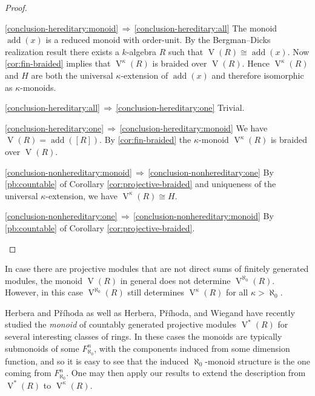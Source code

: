 \documentclass[a4paper,11pt,oneside]{amsart}
\theoremstyle{remark}
\DeclareMathOperator{\add}{add}
\DeclareMathOperator{\Vmon}{V}
\begin{document}
\begin{proof}
  \begin{proofenumerate}
  \item[\ref{hereditary}]
  \ref{conclusion-hereditary:monoid}$\,\Rightarrow\,$\ref{conclusion-hereditary:all}
  The monoid $\add(x)$ is a reduced monoid with order-unit.
  By the Bergman--Dicks realization result there exists a $k$-algebra $R$ such that $\Vmon(R) \cong \add(x)$.
  Now \cref{cor:fin-braided} implies that $\Vmon^{\kappa}(R)$ is braided over $\Vmon(R)$.
  Hence $\Vmon^{\kappa}(R)$ and $H$ are both the universal $\kappa$-extension of $\add(x)$ and therefore isomorphic as $\kappa$-monoids.

  \ref{conclusion-hereditary:all}$\,\Rightarrow\,$\ref{conclusion-hereditary:one} Trivial.
  
  \ref{conclusion-hereditary:one}$\,\Rightarrow\,$\ref{conclusion-hereditary:monoid}
  We have $\Vmon(R) = \add([R])$.
  By \cref{cor:fin-braided} the $\kappa$-monoid $\Vmon^{\kappa}(R)$ is braided over $\Vmon(R)$.
  
  \item[\ref{nonhereditary}]
  \ref{conclusion-nonhereditary:monoid}$\,\Rightarrow\,$\ref{conclusion-nonhereditary:one}
  By \ref{pb:countable} of Corollary \ref{cor:projective-braided} and uniqueness of the universal $\kappa$-extension, we have $\Vmon^{\kappa}(R) \cong H$.

  \ref{conclusion-nonhereditary:one}$\,\Rightarrow\,$\ref{conclusion-nonhereditary:monoid}
  By \ref{pb:countable} of Corollary \ref{cor:projective-braided}. \qedhere
  \end{proofenumerate}
\end{proof}

In case there are projective modules that are not direct sums of finitely generated modules, the monoid $\Vmon(R)$ in general does not determine $\Vmon^{\aleph_0}(R)$.
However, in this case $\Vmon^{\aleph_0}(R)$ still determines $\Vmon^{\kappa}(R)$ for all $\kappa > \aleph_0$.

Herbera and Příhoda \cite{PavelHerbera,infinitepullback} as well as Herbera, Příhoda, and Wiegand \cite{HerberaPrihodaWiegand23} have recently studied the \emph{monoid} of countably generated projective modules $\Vmon^*(R)$ for several interesting classes of rings.
In these cases the monoids are typically submonoids of some $F_{\aleph_0}^n$, with the components induced from some dimension function, and so it is easy to see that the induced $\aleph_0$-monoid structure is the one coming from $F_{\aleph_0}^n$.
One may then apply our results to extend the description from $\Vmon^*(R)$ to $\Vmon^{\kappa}(R)$.
\end{document}
